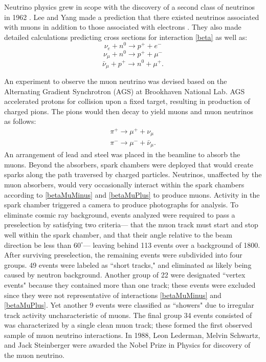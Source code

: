 Neutrino physics grew in scope  with the discovery of a second class of
neutrinos in 1962 \cite{numuDiscovery}.
Lee and Yang made a prediction that there existed neutrinos
associated with muons in addition to those associated with electrons
\cite{lee1957parity}.
They also made detailed calculations predicting cross sections for interaction
\eqref{beta} as well as:
\begin{equation} \label{betaMinus} \nu_e + n^0 \rightarrow p^+ + e^- \end{equation}
\begin{equation} \label{betaMuMinus}\nu_\mu + n^0 \rightarrow  p^+ + \mu^- \end{equation}
\begin{equation} \label{betaMuPlus}\bar{\nu}_\mu + p^+ \rightarrow n^0 + \mu^+ . \end{equation}


An experiment to observe the muon neutrino was devised based on the
Alternating Gradient Synchrotron (AGS) at Brookhaven National Lab.  AGS accelerated protons for collision upon a fixed target, resulting in production
of charged pions.
The pions would then decay to yield muons and muon neutrinos as follows:
\begin{equation} \label{pions} \begin{split}
\pi^+ \rightarrow \mu^+ + \nu_\mu {\ } \\
\pi^- \rightarrow \mu^- + \bar{\nu}_\mu.
\end{split} \end{equation}
An arrangement of lead and steel was placed in the beamline to absorb the
muons.  Beyond the absorbers, spark chambers were deployed that would create
sparks along the path traversed by charged particles.
Neutrinos, unaffected by the muon absorbers, would very occasionally
interact within the spark chambers according to \eqref{betaMuMinus} and
\eqref{betaMuPlus} to produce muons.
Activity in the spark chamber triggered a camera to produce photographs for
analysis.  To eliminate cosmic ray background, events analyzed were required
to pass a preselection by satisfying two criteria--- that the muon track must
start and stop well within the spark chamber, and that their angle relative to
the beam direction be less than $60^\circ$--- leaving behind 113 events over a
background of 1800.  After surviving preselection, the remaining events were
subdivided into four groups.  49 events were labeled as
``short tracks," and eliminated as likely being caused by neutron background.
Another group of 22 were designated ``vertex events"  because they contained
more than one track; these events were excluded since they were not
representative of interactions
\eqref{betaMuMinus} and \eqref{betaMuPlus}.
Yet another 9 events were classified as ``showers"
due to irregular track activity
uncharacteristic of muons.
The final group 34 events consisted of was characterized by a single clean
muon track; these formed the first observed sample of muon neutrino
interactions.
In 1988, Leon Lederman, Melvin Schwartz, and Jack Steinberger were awarded the
Nobel Prize in Physics for discovery of the muon neutrino.

